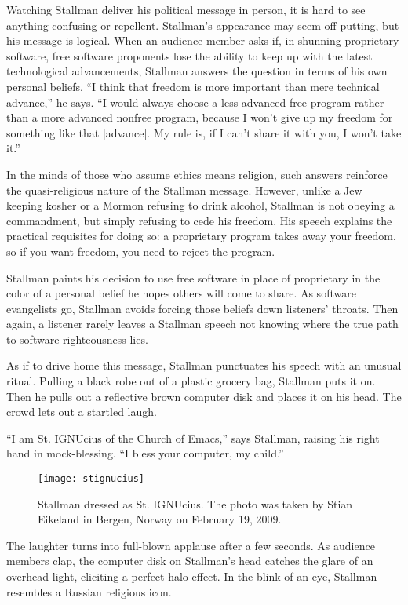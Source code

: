 Watching Stallman deliver his political message in person, it is hard to see anything confusing or repellent. Stallman's appearance may seem off-putting, but his message is logical. When an audience member asks if, in shunning proprietary software, free software proponents lose the ability to keep up with the latest technological advancements, Stallman answers the question in terms of his own personal beliefs. ``I think that freedom is more important than mere technical advance,'' he says. ``I would always choose a less advanced free program rather than a more advanced nonfree program, because I won't give up my freedom for something like that [advance]. My rule is, if I can't share it with you, I won't take it.''

In the minds of those who assume ethics means religion, such answers reinforce the quasi-religious nature of the Stallman message. However, unlike a Jew keeping kosher or a Mormon refusing to drink alcohol, Stallman is not obeying a commandment, but simply refusing to cede his freedom.  His speech explains the practical requisites for doing so: a proprietary program takes away your freedom, so if you want freedom, you need to reject the program.

Stallman paints his decision to use free software in place of proprietary in the color of a personal belief he hopes others will come to share. As software evangelists go, Stallman avoids forcing those beliefs down listeners' throats. Then again, a listener rarely leaves a Stallman speech not knowing where the true path to software righteousness lies.

As if to drive home this message, Stallman punctuates his speech with an unusual ritual. Pulling a black robe out of a plastic grocery bag, Stallman puts it on.  Then he pulls out a reflective brown computer disk and places it on his head. The crowd lets out a startled laugh.

``I am St. IGNUcius of the Church of Emacs,'' says Stallman, raising his right hand in mock-blessing. ``I bless your computer, my child.''

\begin{figure}[ht] \centering
  \texttt{[image: stignucius]}
  \caption{Stallman dressed as St. IGNUcius. The photo was taken by Stian Eikeland in Bergen, Norway on February 19, 2009.}
\end{figure}

The laughter turns into full-blown applause after a few seconds. As audience members clap, the computer disk on Stallman's head catches the glare of an overhead light, eliciting a perfect halo effect. In the blink of an eye, Stallman resembles a Russian religious icon.

